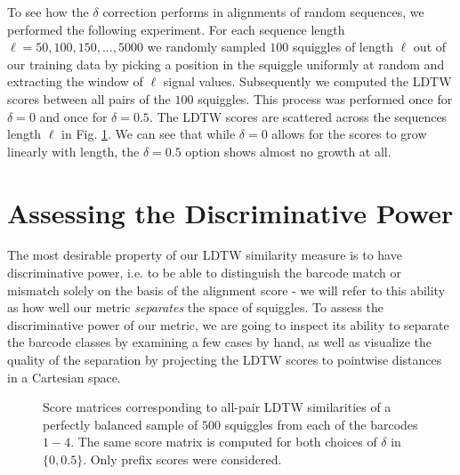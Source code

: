 To see how the $\delta$ correction performs in alignments of random sequences, we performed the following experiment. For each sequence length $\ell = 50, 100, 150, ..., 5000$ we randomly sampled $100$ squiggles of length $\ell$ out of our training data by picking a position in the squiggle uniformly at random and extracting the window of $\ell$ signal values. Subsequently we computed the LDTW scores between all pairs of the $100$ squiggles. This process was performed once for $\delta = 0$ and once for $\delta = 0.5$. The LDTW scores are scattered across the sequences length $\ell$ in Fig. \ref{fig:delta_samples}. We can see that while $\delta = 0$ allows for the scores to grow linearly with length, the $\delta = 0.5$ option shows almost no growth at all.


\section{Assessing the Discriminative Power}
The most desirable property of our LDTW similarity measure is to have discriminative power, i.e. to be able to distinguish the barcode match or mismatch solely on the basis of the alignment score - we will refer to this ability as how well our metric \textit{separates} the space of squiggles. To assess the discriminative power of our metric, we are going to inspect its ability to separate the barcode classes by examining a few cases by hand, as well as visualize the quality of the separation by projecting the LDTW scores to pointwise distances in a Cartesian space.

\begin{figure}[!ht]
    \centering
    \qquad
    \caption[Prefix sample LDTW scores]{Score matrices corresponding to all-pair LDTW similarities of a perfectly balanced sample of $500$ squiggles from each of the barcodes $1-4$. The same score matrix is computed for both choices of $\delta$ in $\{0, 0.5\}$. Only prefix scores were considered.}
    \label{fig:delta_samples}
\end{figure}

